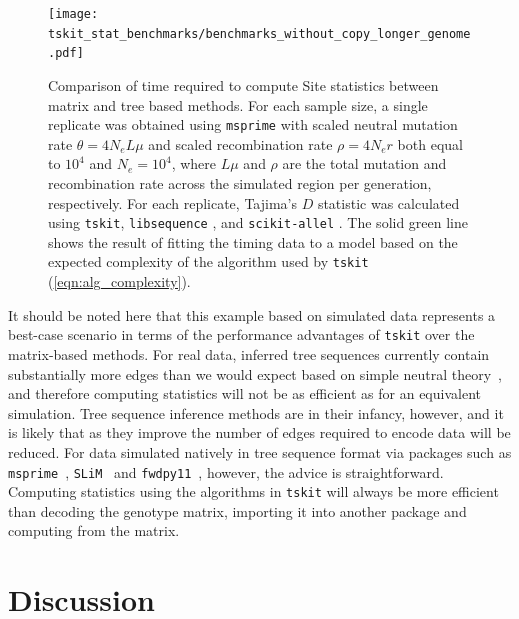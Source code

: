 \documentclass{article}
\newcommand{\tskit}{{\texttt{tskit}}}
\begin{document}
\begin{figure}
    \centering
    \texttt{[image: tskit\_stat\_benchmarks/benchmarks\_without\_copy\_longer\_genome.pdf]}
    \caption{Comparison of time required to compute Site statistics
        between matrix and tree based methods. For each sample size, a single replicate
        was obtained using \texttt{msprime} with scaled neutral mutation rate $\theta = 4 N_e L \mu$ and
        scaled recombination rate $\rho = 4N_er$ both equal to $10^4$ and $N_e = 10^4$,
        where $L\mu$ and $\rho$ are the total mutation and recombination rate across the simulated region
        per generation, respectively.
        For each replicate, Tajima's $D$
        \citep{Tajima1989-de} statistic was calculated using \tskit, \texttt{libsequence}
        \citep{Thornton2003-wj}, and \texttt{scikit-allel} \citep{miles2017scikit}.
        The solid green line shows the result of fitting the timing data to a model based on the expected complexity of the algorithm used by \texttt{tskit}
        (\autoref{eqn:alg_complexity}).
        \label{fig:stats_performance}
    }
\end{figure}

It should be noted here that this example based on simulated data
represents a best-case scenario in terms of the performance advantages
of \tskit{} over the matrix-based methods. For real data, inferred
tree sequences currently contain substantially more edges than we
would expect based on simple neutral theory~\citep{kelleher2019inferring},
and therefore computing statistics will not be as efficient as
for an equivalent simulation. Tree sequence inference
methods are in their infancy, however, and it is likely that
as they improve the number of edges required to encode data will
be reduced. For data simulated natively in tree sequence format
via packages such as \texttt{msprime}~\citep{kelleher2016efficient},
\texttt{SLiM}~\citep{haller2018tree,haller2019slim} and
\texttt{fwdpy11}~\citep{thornton2014c++}, however, the advice is straightforward.
Computing statistics using the algorithms in \tskit{}
will always be more efficient than decoding the genotype
matrix, importing it into another package and computing from the matrix.


\section*{Discussion}
\end{document}
